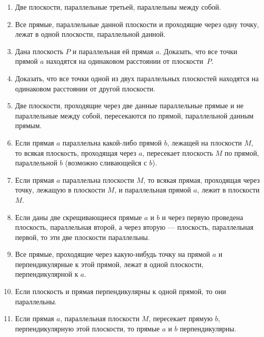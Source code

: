 \documentclass[twoside]{book}
\begin{document}
\begin{enumerate}

\item
Две плоскости, параллельные третьей, параллельны между собой.

\item
Все прямые, параллельные данной плоскости и проходящие через одну точку, лежат в одной плоскости, параллельной данной.

\item Дана плоскость $P$ и параллельная ей прямая $a$.
Доказать, что все точки прямой $a$ находятся на одинаковом расстоянии от плоскости~$P$.

\item
Доказать, что все точки одной из двух параллельных плоскостей находятся на одинаковом расстоянии от другой плоскости.

\item
Две плоскости, проходящие через две данные параллельные прямые и не параллельные между собой, пересекаются по прямой, параллельной данным прямым.

\item
Если прямая $a$ параллельна какой-либо прямой $b$, лежащей на плоскости $M$, то всякая плоскость, проходящая через $a$, пересекает плоскость $M$ по прямой, параллельной $b$ (возможно сливающейся с $b$).

\item
Если прямая $a$ параллельна плоскости $M$, то всякая прямая, проходящая через точку, лежащую в плоскости $M$, и параллельная прямой $a$, лежит в плоскости $M$.

\item
Если даны две скрещивающиеся прямые $a$ и $b$ и через первую проведена плоскость, параллельная второй, а через вторую --- плоскость, параллельная первой, то эти две плоскости параллельны.

\item
Все прямые, проходящие через какую-нибудь точку на прямой $a$ и перпендикулярные к этой прямой, лежат в одной плоскости, перпендикулярной к $a$.

\item
Если плоскость и прямая перпендикулярны к одной прямой, то они параллельны.

\item
Если прямая $a$, параллельная плоскости $M$, пересекает прямую $b$, перпендикулярную этой плоскости, то прямые $a$ и $b$ перпендикулярны.
\end{enumerate}
\end{document}
